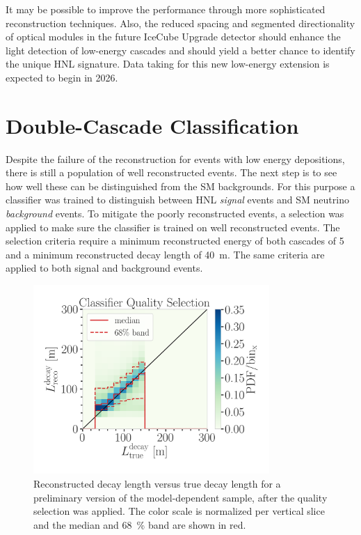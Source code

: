 It may be possible to improve the performance through more sophisticated reconstruction techniques. Also, the reduced spacing and segmented directionality of optical modules in the future IceCube Upgrade detector should enhance the light detection of low-energy cascades and should yield a better chance to identify the unique HNL signature. Data taking for this new low-energy extension is expected to begin in 2026.


\section{Double-Cascade Classification} 

Despite the failure of the reconstruction for events with low energy depositions, there is still a population of well reconstructed events. The next step is to see how well these can be distinguished from the SM backgrounds. For this purpose a classifier was trained to distinguish between HNL \textit{signal} events and SM neutrino \textit{background} events. To mitigate the poorly reconstructed events, a selection was applied to make sure the classifier is trained on well reconstructed events. The selection criteria require a minimum reconstructed energy of both cascades of \SI{5}{\gev} and a minimum reconstructed decay length of \SI{40}{\meter}. The same criteria are applied to both signal and background events.

\begin{figure}[h]
    \centering
    \includegraphics[width=0.8\textwidth]{figures/results/190607/classification/reco_decayL_vs_true_decayL_reco_energy_cut_and_reco_length_cut_and_true_energy_cut_and_true_length_cut_step_contours.png}
    \caption[Reconstructed decay length resolution versus true decay length after quality selection - preliminary model-dependent sample]{Reconstructed decay length versus true decay length for a preliminary version of the model-dependent sample, after the quality selection was applied. The color scale is normalized per vertical slice and the median and \SI{68}{\percent} band are shown in red.}
\end{figure}

